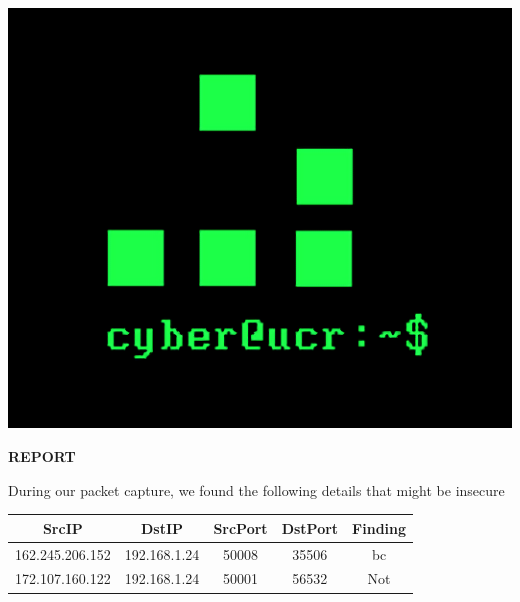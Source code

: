 \documentclass{article}
\begin{document}
\begin{center}
	\includegraphics[scale=0.25]{Cyber_525x438.png}\\
\end{center}	
\centerline{\large \bf REPORT}
\begin{center}
During our packet capture, we found the following details that might be insecure\\
 \begin{tabular}{||c c c c c||} 
 \hline 
 SrcIP & DstIP & SrcPort & DstPort & Finding \\ [0.5ex] 
 \hline\hline
162.245.206.152 & 192.168.1.24 & 50008 & 35506 & bc \\
\hline
172.107.160.122 & 192.168.1.24 & 50001 & 56532 & Not \\
\hline
\end{tabular}
\end{center}
\end{document}

